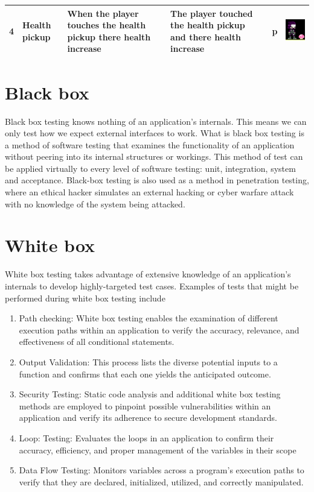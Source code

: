 \documentclass{article}
\begin{document}
\begin{center}
\begin{tabular}{|m{1em}|m{3em}|m{20em}|m{5em}|m{1.5em}|m{10em}|}
	\hline
		4 & Health pickup  & When the player touches the health pickup there health increase & The player touched the health pickup and there health increase & p & \includegraphics[scale=0.75]{health 1} \\
	\hline
\end{tabular}
\end{center}

\break
\section{Black box}
Black box testing knows nothing of an application’s internals. This means we can only test how we expect external interfaces to work. What is black box testing is a method of software testing that examines the functionality of an application without peering into its internal structures or workings. This method of test can be applied virtually to every level of software testing: unit, integration, system and acceptance. Black-box testing is also used as a method in penetration testing, where an ethical hacker simulates an external hacking or cyber warfare attack with no knowledge of the system being attacked. 

\section{White box}
White box testing takes advantage of extensive knowledge of an application's internals to develop highly-targeted test cases. Examples of tests that might be performed during white box testing include

\begin{enumerate}
	\item Path checking: White box testing enables the examination of different execution paths within an application to verify the accuracy, relevance, and effectiveness of all conditional statements.
	\item Output Validation: This process lists the diverse potential inputs to a function and confirms that each one yields the anticipated outcome.
	\item Security Testing: Static code analysis and additional white box testing methods are employed to pinpoint possible vulnerabilities within an application and verify its adherence to secure development standards.
	\item Loop: Testing: Evaluates the loops in an application to confirm their accuracy, efficiency, and proper management of the variables in their scope 
	\item Data Flow Testing: Monitors variables across a program's execution paths to verify that they are declared, initialized, utilized, and correctly manipulated.
\end{enumerate}
\end{document}
